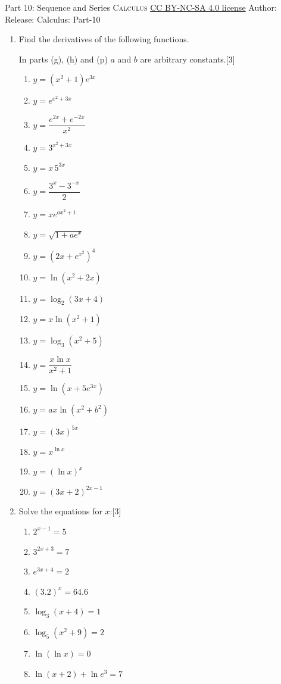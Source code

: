 \newpage\handout
{Part 10: Sequence and Series}
{\textsc{Calculus}}
{\href{https://creativecommons.org/licenses/by-nc-sa/4.0/}{CC BY-NC-SA 4.0 license}}
{Author: \BookAuthor}{Release: \generatedOn}
{Calculus: Part-10}



\begin{enumerate}
\item Find the derivatives of the following functions. 
\begin{multicolblock}{In parts (g), (h) and (p) $a$ and $b$ are arbitrary constants.}[3]
  \begin{enumerate}
    \item $y=\left(x^{2}+1\right)e^{3x}$
    \item $y=e^{x^{2}+3x}$
    \item $y=\dfrac{e^{2x}+e^{-2x}}{x^{2}}$
    \item $y=3^{x^{2}+3x}$
    \item $y=x\,5^{3x}$
    \item $y=\dfrac{3^{x}-3^{-x}}{2}$
    \item $y=x e^{a x^{2}+1}$
    \item $y=\sqrt{1+a e^{x}}$
    \item $y=\left(2x+e^{x^{2}}\right)^{4}$
    \item $y=\ln\left(x^{2}+2x\right)$
    \item $y=\log_{2}(3x+4)$
    \item $y=x\ln\left(x^{2}+1\right)$
    \item $y=\log_{3}\left(x^{2}+5\right)$
    \item $y=\dfrac{x\ln x}{x^{2}+1}$
    \item $y=\ln\left(x+5e^{3x}\right)$
    \item $y=a x\ln\left(x^{2}+b^{2}\right)$
    \item $y=(3x)^{5x}$
    \item $y=x^{\ln x}$
    \item $y=(\ln x)^{x}$
    \item $y=(3x+2)^{2x-1}$
  \end{enumerate}
\end{multicolblock}

\item 
\begin{multicolblock}{Solve the equations for $x$:}[3]
  \begin{enumerate}
    \item $2^{x-1}=5$
    \item $3^{2x+3}=7$
    \item $e^{3x+4}=2$
    \item $(3.2)^{x}=64.6$
    \item $\log_{3}(x+4)=1$
    \item $\log_{5}\!\left(x^{2}+9\right)=2$
    \item $\ln(\ln x)=0$
    \item $\ln(x+2)+\ln e^{3}=7$
  \end{enumerate}
\end{multicolblock}


\end{enumerate}

